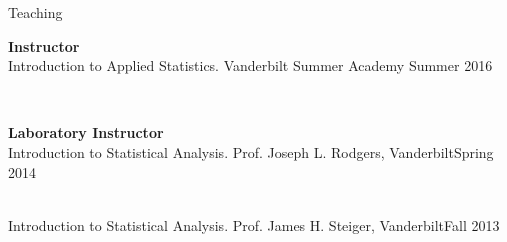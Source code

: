 \begin{rSection}{\textrm{Teaching}}
\vspace*{2pt}
\begin{minipage}{\linewidth}{\large {\bf Instructor}\\}
Introduction to Applied Statistics. Vanderbilt Summer Academy \hfill{Summer 2016}\vspace{2pt}
\begin{comment}\begin{quote}\small Course Description: Media stories about ``the latest scientific findings'' can range from the plausible to the silly. This class will help you learn to separate truth from  fiction by introducing you to the basic statistical methods and tools used in psychological  research. You will learn to use \R, a free and powerful statistical software package, to conduct and interpret basic scientific statistical tests. You will begin to recognize the difference between proper and improper use of data, especially the distinction between correlation and causation (\textit{e.g.}, why margarine consumption does not actually lead to more divorces in the state of Maine). For the final project, you will formulate and answer your own scientific question using these new tools and real psychology data.
\end{quote}\end{comment}
\end{minipage}
\smallskip\\
\begin{minipage}{\linewidth}{\large {\bf Laboratory Instructor}\\}
Introduction to Statistical Analysis. Prof. Joseph L. Rodgers, Vanderbilt\hfill  {Spring 2014}%
\end{minipage}\smallskip\\
Introduction to Statistical Analysis. Prof. James H. Steiger, Vanderbilt\hfill  {Fall 2013}%
\medskip\\

\end{rSection}
